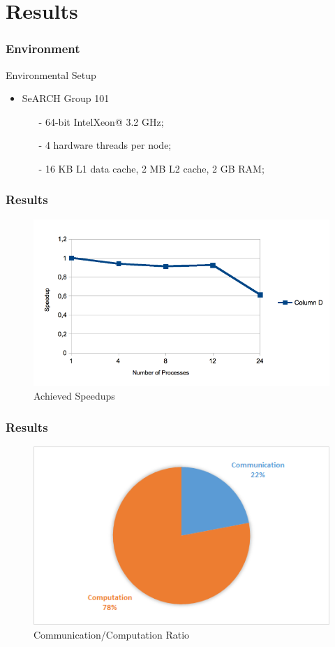 \documentclass{beamer}
\begin{document}
\section{Results}

\begin{frame}
	\frametitle{Environment}
	\begin{block}{Environmental Setup}
		\begin{itemize}
			\item{SeARCH Group 101
			\begin{itemize}
				\item[-]{64-bit Intel\textregistered Xeon\texttrademark @ 3.2 GHz;}
				\item[-]{4 hardware threads per node;}
				\item[-]{16 KB L1 data cache, 2 MB L2 cache, 2 GB RAM;}
			\end{itemize}
			}			
		\end{itemize}
	\end{block}	
\end{frame}

\begin{frame}
	\frametitle{Results}
	\begin{figure}[!htp]
    \centering   
        \includegraphics[width=.9\textwidth]{images/speedup.png}
        \caption{Achieved Speedups}    
\end{figure}
\end{frame}

\begin{frame}
	\frametitle{Results}
	\begin{figure}[!htp]
    \centering   
        \includegraphics[width=.9\textwidth]{images/com.png}
        \caption{Communication/Computation Ratio}    
\end{figure}
\end{frame}
\end{document}
